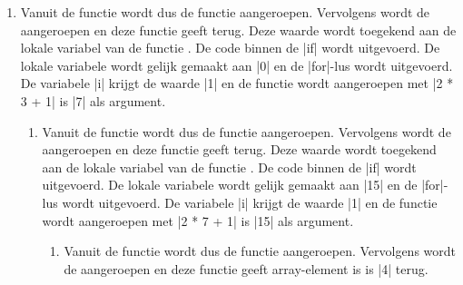 \begin{cpplstShortInline}
\begin{enumerate}[leftmargin=1.4em]
\begin{enumerate}[label*=\arabic*.,leftmargin=1.4em]
		\begin{enumerate}[label*=\arabic*.,leftmargin=1.4em]
			\item Vanuit de functie wordt dus de functie  aangeroepen.
			Vervolgens wordt de  aangeroepen en
			deze functie geeft  terug.
			Deze waarde wordt toegekend aan de lokale variabel  van de functie .
			De code binnen de |if| wordt uitgevoerd.
			De lokale variabele  wordt gelijk gemaakt aan |0| en de |for|-lus wordt uitgevoerd.
			De variabele |i| krijgt de waarde |1| en de functie  wordt aangeroepen met |2 * 3 + 1| is |7| als argument.
			\begin{enumerate}[label*=\arabic*.,leftmargin=1.4em]
				\item Vanuit de functie  wordt dus de functie  aangeroepen.
				Vervolgens wordt de  aangeroepen en deze functie geeft  terug.
				Deze waarde wordt toegekend aan de lokale variabel  van de functie .
				De code binnen de |if| wordt uitgevoerd.
				De lokale variabele  wordt gelijk gemaakt aan |15| en de |for|-lus wordt uitgevoerd.
				De variabele |i| krijgt de waarde |1| en de functie  wordt aangeroepen met |2 * 7 + 1| is |15| als argument.
				\begin{enumerate}[label*=\arabic*.,leftmargin=1.4em]
					\item Vanuit de functie  wordt dus de functie  aangeroepen.
					Vervolgens wordt de  aangeroepen en deze functie geeft array-element  is  is |4| terug.

\end{enumerate}
\end{enumerate}
\end{enumerate}
\end{enumerate}
\end{enumerate}
\end{cpplstShortInline}
